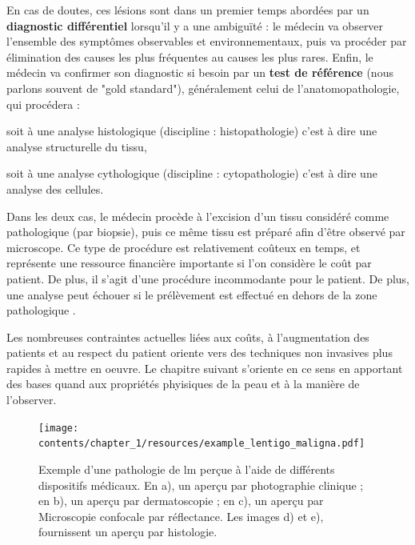 En cas de doutes, ces lésions sont dans un premier temps abordées par un \textbf{diagnostic différentiel} lorsqu'il y a une ambiguïté : le médecin va observer l'ensemble des symptômes observables et environnementaux, puis va procéder par élimination des causes les plus fréquentes au causes les plus rares. Enfin, le médecin va confirmer son diagnostic si besoin par un \textbf{test de référence} (nous parlons souvent de "gold standard"), généralement celui de l'anatomopathologie, qui procédera :
\begin{inlinerate}
\item soit à une analyse histologique (discipline : histopathologie) c'est à dire une analyse structurelle du tissu,
\item soit à une analyse cythologique (discipline : cytopathologie) c'est à dire une analyse des cellules.
\end{inlinerate}
Dans les deux cas, le médecin procède à l'excision d'un tissu considéré comme pathologique (par biopsie), puis ce même tissu est préparé afin d'être observé par microscope. Ce type de procédure est relativement coûteux en temps, et représente une ressource financière importante si l'on considère le coût par patient. De plus, il s'agit d'une procédure incommodante pour le patient. De plus, une analyse peut échouer si le prélèvement est effectué en dehors de la zone pathologique \cite{LeGal2011}.\par

Les nombreuses contraintes actuelles liées aux coûts, à l'augmentation des patients et au respect du patient oriente vers des techniques non invasives plus rapides à mettre en oeuvre. Le chapitre suivant s'oriente en ce sens en apportant des bases quand aux propriétés phyisiques de la peau et à la manière de l'observer.\par

\begin{figure}[H]
    \centering
    \texttt{[image: contents/chapter\_1/resources/example\_lentigo\_maligna.pdf]}
    \caption{Exemple d'une pathologie de \gls{lm} perçue à l'aide de différents dispositifs médicaux. En a), un aperçu par photographie clinique ; en b), un aperçu par dermatoscopie ; en c), un aperçu par Microscopie confocale par réflectance. Les images d) et e), fournissent un aperçu par histologie.}
    \label{fig:example_lentigo_maligna}
\end{figure}\par